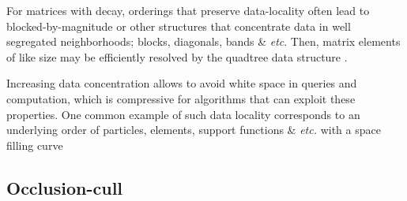 \documentclass[letterpaper,twocolumn,amsmath,amsfont,amssymb,english,aps,jcp,preprintnumbers,groupaddress,nofootinbib,tightenlines,floatfix]{revtex4}
\theoremstyle{plain}
\theoremstyle{remark}
\theoremstyle{plain}
\begin{document}
For matrices with decay, orderings that preserve data-locality often 
lead to blocked-by-magnitude or other structures that concentrate data in 
well segregated neighborhoods; blocks, diagonals, bands \& {\em etc}.   
Then, matrix elements of like size may be efficiently resolved by the quadtree data structure 
\cite{Wise:1984:RMQ:1089389.1089398,springerlink:10.1007/3-540-51084-2_9,
      Samet:1990:DAS:77589,Wise1990,Wise:Ahnentafel,
      Lorton:2006:ABL:1166133.1166134,Samet:2006:DBDS,Adams:2006:SOS,Bock2013,bader13}.

Increasing data concentration allows to avoid white space in queries and 
computation, which is compressive for algorithms that can exploit these properties.
One common example of such data locality corresponds to an underlying order
of particles, elements, support functions \& {\em etc.} with a space filling curve 
\cite{Aluru:1997:SFC,Bader:2006:SFC,Campbell:2003:SFC,Devine:2005:SFC,Lashuk:2009:SFC, 
Gunther2006,Camata2010,1298805,Bock2013,bader13}

\subsection{Occlusion-cull }
\end{document}
